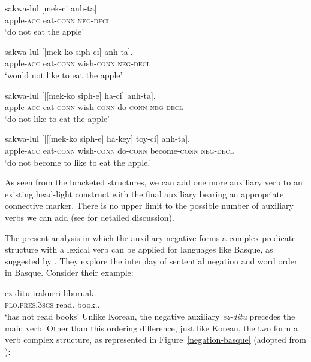 \documentclass[output=paper
                ,modfonts
                ,nonflat
	        ,collection
	        ,collectionchapter
	        ,collectiontoclongg
 	        ,biblatex
                ,babelshorthands
                ,newtxmath
                ,draftmode
                ,colorlinks, citecolor=brown
]{./langsci/langscibook}
\begin{document}
{\begin{exe}
\begin{xlist}
\begin{exe}
\begin{xlist}
\eal\ex \gll sakwa-lul [mek-ci anh-ta]. \\
apple-\textsc{acc} eat-\textsc{conn} \textsc{neg}-\textsc{decl} \\
\glt`do not eat the apple'

\ex \gll sakwa-lul [[mek-ko siph-ci] anh-ta]. \\
apple-\textsc{acc} eat-\textsc{conn} wish-\textsc{conn} \textsc{neg}-\textsc{decl} \\
\glt`would not like to eat the apple'

\ex \label{negation-20c} \gll sakwa-lul [[[mek-ko siph-e] ha-ci] anh-ta]. \\
apple-\textsc{acc} eat-\textsc{conn} wish-\textsc{conn} do-\textsc{conn} \textsc{neg}-\textsc{decl} \\
\glt`do not like to eat the apple'

\ex \gll sakwa-lul [[[[mek-ko siph-e] ha-key] toy-ci] anh-ta]. \\
apple-\textsc{acc} eat-\textsc{conn} wish-\textsc{conn} do-\textsc{conn} become-\textsc{conn} \textsc{neg}-\textsc{decl} \\
\glt`do not become to like to eat the apple.'
\end{xlist} \end{exe}
%
As seen from the bracketed structures, we can add one more auxiliary verb to
an existing head-light construct with the final auxiliary bearing an appropriate
  connective marker. There is no upper limit to the possible number  of auxiliary
  verbs we can add (see \citealt{Kim:16} for detailed discussion).

The present analysis in which the auxiliary negative forms a complex
predicate structure with a lexical verb can be applied for languages
like Basque, as suggested by \citet{CB:11}. They explore the interplay of sentential
negation and word order in Basque. Consider their example:

\ea
\label{negation-basque-ex}
\gll ez-ditu irakurri liburuak. \\
     \textsc{plo.pres.3sgs} read.\PRF{} book.\ABS.\pl\\
\glt `has not read books'
\z
%
%
Unlike Korean, the negative auxiliary \textit{ez-ditu} precedes
the main verb. Other than this ordering difference, just
like Korean, the two form a verb complex structure, as represented in
Figure~\ref{negation-basque} (adopted from \citealt{CB:11}):


\end{xlist}
\end{exe}}
\end{document}
